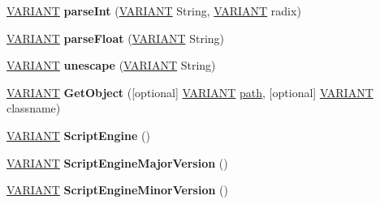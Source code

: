 \begin{DoxyCompactItemize}
\item 
\mbox{\label{interface_j_s_global_1_1_global_obj_aa5a38a5cb4c08f11ba73fe0af18f6af1}} 
\hyperlink{structtag_v_a_r_i_a_n_t}{V\+A\+R\+I\+A\+NT} {\bfseries parse\+Int} (\hyperlink{structtag_v_a_r_i_a_n_t}{V\+A\+R\+I\+A\+NT} String, \hyperlink{structtag_v_a_r_i_a_n_t}{V\+A\+R\+I\+A\+NT} radix)
\item 
\mbox{\label{interface_j_s_global_1_1_global_obj_ac49733b76009d85f4c235dddc586c1ce}} 
\hyperlink{structtag_v_a_r_i_a_n_t}{V\+A\+R\+I\+A\+NT} {\bfseries parse\+Float} (\hyperlink{structtag_v_a_r_i_a_n_t}{V\+A\+R\+I\+A\+NT} String)
\item 
\mbox{\label{interface_j_s_global_1_1_global_obj_a34b4c34124acf426052bd39f895ae131}} 
\hyperlink{structtag_v_a_r_i_a_n_t}{V\+A\+R\+I\+A\+NT} {\bfseries unescape} (\hyperlink{structtag_v_a_r_i_a_n_t}{V\+A\+R\+I\+A\+NT} String)
\item 
\mbox{\label{interface_j_s_global_1_1_global_obj_a6685a8246bb121e60f81dc8f8874a01c}} 
\hyperlink{structtag_v_a_r_i_a_n_t}{V\+A\+R\+I\+A\+NT} {\bfseries Get\+Object} (\mbox{[}optional\mbox{]} \hyperlink{structtag_v_a_r_i_a_n_t}{V\+A\+R\+I\+A\+NT} \hyperlink{structpath}{path}, \mbox{[}optional\mbox{]} \hyperlink{structtag_v_a_r_i_a_n_t}{V\+A\+R\+I\+A\+NT} classname)
\item 
\mbox{\label{interface_j_s_global_1_1_global_obj_a52f1fb6a2a89e22765efb4c82744437f}} 
\hyperlink{structtag_v_a_r_i_a_n_t}{V\+A\+R\+I\+A\+NT} {\bfseries Script\+Engine} ()
\item 
\mbox{\label{interface_j_s_global_1_1_global_obj_ab4eb10a6555ca86d7f1f463ae7dfb35b}} 
\hyperlink{structtag_v_a_r_i_a_n_t}{V\+A\+R\+I\+A\+NT} {\bfseries Script\+Engine\+Major\+Version} ()
\item 
\mbox{\label{interface_j_s_global_1_1_global_obj_a0f24830d0cf4ac499fa6c2dc7fdcb07f}} 
\hyperlink{structtag_v_a_r_i_a_n_t}{V\+A\+R\+I\+A\+NT} {\bfseries Script\+Engine\+Minor\+Version} ()
\item 

\end{DoxyCompactItemize}
